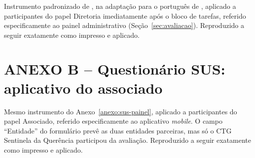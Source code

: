 \documentclass[12pt,a4paper]{article}
\begin{document}
Instrumento padronizado de \textcite{brooke1996}, na adaptação para o português de
\textcite{lourenco2022}, aplicado a participantes do papel Diretoria imediatamente após o bloco de
tarefas, referido especificamente ao painel administrativo (Seção~\ref{sec:avaliacao}). Reproduzido
a seguir exatamente como impresso e aplicado.



\clearpage
\section*{ANEXO B -- Questionário SUS: aplicativo do associado}
\makeatletter
\renewcommand{\@currentlabel}{B}
\makeatother
\label{anexo:sus-app}

Mesmo instrumento do Anexo~\ref{anexo:sus-painel}, aplicado a participantes do papel Associado,
referido especificamente ao aplicativo \textit{mobile}. O campo ``Entidade'' do formulário
prevê as duas entidades parceiras, mas só o CTG Sentinela da Querência participou da avaliação.
Reproduzido a seguir exatamente como impresso e aplicado.


\end{document}

